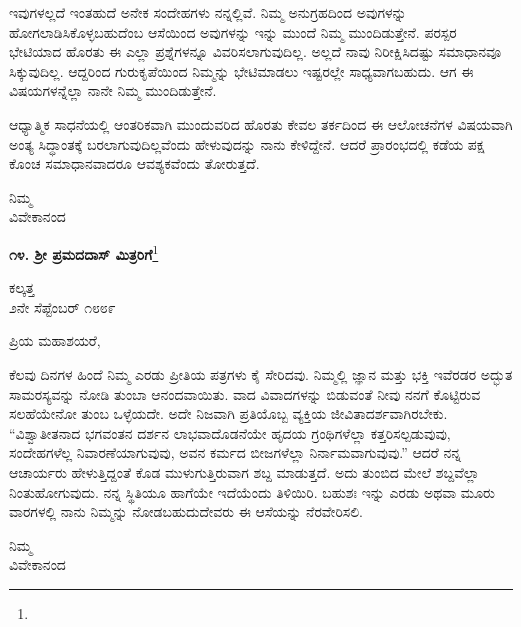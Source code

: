 ಇವುಗಳಲ್ಲದೆ ಇಂತಹುದೆ ಅನೇಕ ಸಂದೇಹಗಳು ನನ್ನಲ್ಲಿವೆ. ನಿಮ್ಮ ಅನುಗ್ರಹದಿಂದ ಅವುಗಳನ್ನು ಹೋಗಲಾಡಿಸಿಕೊಳ್ಳಬಹುದೆಂಬ ಆಸೆಯಿಂದ ಅವುಗಳನ್ನು ಇನ್ನು ಮುಂದೆ ನಿಮ್ಮ ಮುಂದಿಡುತ್ತೇನೆ. ಪರಸ್ಪರ ಭೇಟಿಯಾದ ಹೊರತು ಈ ಎಲ್ಲಾ ಪ್ರಶ್ನೆಗಳನ್ನೂ ವಿವರಿಸಲಾಗುವುದಿಲ್ಲ. ಅಲ್ಲದೆ ನಾವು ನಿರೀಕ್ಷಿಸಿದಷ್ಟು ಸಮಾಧಾನವೂ ಸಿಕ್ಕುವುದಿಲ್ಲ. ಆದ್ದರಿಂದ ಗುರುಕೃಪೆಯಿಂದ ನಿಮ್ಮನ್ನು ಭೇಟಿಮಾಡಲು ಇಷ್ಟರಲ್ಲೇ ಸಾಧ್ಯವಾಗಬಹುದು. ಆಗ ಈ ವಿಷಯಗಳನ್ನೆಲ್ಲಾ ನಾನೇ ನಿಮ್ಮ ಮುಂದಿಡುತ್ತೇನೆ.

ಆಧ್ಯಾತ್ಮಿಕ ಸಾಧನೆಯಲ್ಲಿ ಆಂತರಿಕವಾಗಿ ಮುಂದುವರಿದ ಹೊರತು ಕೇವಲ ತರ್ಕದಿಂದ ಈ ಆಲೋಚನೆಗಳ ವಿಷಯವಾಗಿ ಅಂತ್ಯ ಸಿದ್ಧಾಂತಕ್ಕೆ ಬರಲಾಗುವುದಿಲ್ಲವೆಂದು ಹೇಳುವುದನ್ನು ನಾನು ಕೇಳಿದ್ದೇನೆ. ಆದರೆ ಪ್ರಾರಂಭದಲ್ಲಿ ಕಡೆಯ ಪಕ್ಷ ಕೊಂಚ ಸಮಾಧಾನವಾದರೂ ಆವಶ್ಯಕವೆಂದು ತೋರುತ್ತದೆ.

\vspace{-0.4cm}
{\flushright
ನಿಮ್ಮ\\ವಿವೇಕಾನಂದ\par}


\begin{center}
\textbf{೧೪. ಶ‍್ರೀ ಪ್ರಮದದಾಸ್ ಮಿತ್ರರಿಗೆ}\footnote{}
\end{center}
\vspace{-0.8cm}

\begin{flushright}
ಕಲ್ಕತ್ತ\\೨ನೇ ಸೆಪ್ಟೆಂಬರ್ ೧೮೮೯
\end{flushright}
\vspace{-0.3cm}

\noindent
ಪ್ರಿಯ ಮಹಾಶಯರೆ,

ಕೆಲವು ದಿನಗಳ ಹಿಂದೆ ನಿಮ್ಮ ಎರಡು ಪ್ರೀತಿಯ ಪತ್ರಗಳು ಕೈ ಸೇರಿದವು. ನಿಮ್ಮಲ್ಲಿ ಜ್ಞಾನ ಮತ್ತು ಭಕ್ತಿ ಇವೆರಡರ ಅದ್ಭುತ ಸಾಮರಸ್ಯವನ್ನು ನೋಡಿ ತುಂಬಾ ಆನಂದವಾಯಿತು. ವಾದ ವಿವಾದಗಳನ್ನು ಬಿಡುವಂತೆ ನೀವು ನನಗೆ ಕೊಟ್ಟಿರುವ ಸಲಹೆಯೇನೋ ತುಂಬ ಒಳ್ಳೆಯದೇ. ಅದೇ ನಿಜವಾಗಿ ಪ್ರತಿಯೊಬ್ಬ ವ್ಯಕ್ತಿಯ ಜೀವಿತಾದರ್ಶವಾಗಿರಬೇಕು. “ವಿಶ್ವಾತೀತನಾದ ಭಗವಂತನ ದರ್ಶನ ಲಾಭವಾದೊಡನೆಯೇ ಹೃದಯ ಗ್ರಂಥಿಗಳೆಲ್ಲಾ ಕತ್ತರಿಸಲ್ಪಡುವುವು, ಸಂದೇಹಗಳೆಲ್ಲ ನಿವಾರಣೆಯಾಗುವುವು, ಅವನ ಕರ್ಮದ ಬೀಜಗಳೆಲ್ಲಾ ನಿರ್ನಾಮವಾಗುವುವು.” ಆದರೆ ನನ್ನ ಆಚಾರ್ಯರು ಹೇಳುತ್ತಿದ್ದಂತೆ ಕೊಡ ಮುಳುಗುತ್ತಿರುವಾಗ ಶಬ್ದ ಮಾಡುತ್ತದೆ. ಅದು ತುಂಬಿದ ಮೇಲೆ ಶಬ್ದವೆಲ್ಲಾ ನಿಂತುಹೋಗುವುದು. ನನ್ನ ಸ್ಥಿತಿಯೂ ಹಾಗೆಯೇ ಇದೆಯೆಂದು ತಿಳಿಯಿರಿ. ಬಹುಶಃ ಇನ್ನು ಎರಡು ಅಥವಾ ಮೂರು ವಾರಗಳಲ್ಲಿ ನಾನು ನಿಮ್ಮನ್ನು ನೋಡಬಹುದು\enginline{-}ದೇವರು ಈ ಆಸೆಯನ್ನು ನೆರವೇರಿಸಲಿ.

\vspace{-0.4cm}

{\flushright
ನಿಮ್ಮ\\ವಿವೇಕಾನಂದ\par}
\vspace{-0.5cm}

